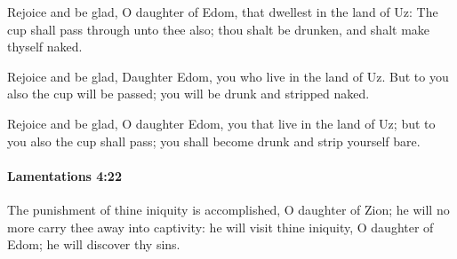 			\begin{versebox}
					\item[BHS] 
					\item[LXX] 
					\item[ASV] Rejoice and be glad, O daughter of Edom, that dwellest in the land of Uz: The cup shall pass through unto thee also; thou shalt be drunken, and shalt make thyself naked.
					\item[NIV] Rejoice and be glad, Daughter Edom, you who live in the land of Uz. But to you also the cup will be passed; you will be drunk and stripped naked.
					\item[NRSV] Rejoice and be glad, O daughter Edom, you that live in the land of Uz; but to you also the cup shall pass; you shall become drunk and strip yourself bare.
			\end{versebox}

		\paragraph{Lamentations 4:22} %
			\label{LAMENTATIONS-4-22}

			The punishment of thine iniquity is accomplished, O daughter of Zion; he will no more carry thee away into captivity: he will visit thine iniquity, O daughter of Edom; he will discover thy sins.

